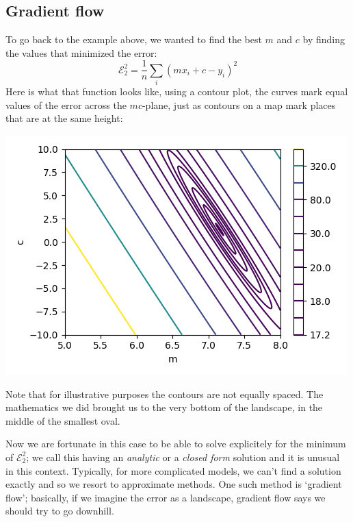 \documentclass[12pt]{article}
\begin{document}
\subsection*{Gradient flow}

To go back to the example above, we wanted to find the best $m$ and $c$ by finding the values that minimized the error:
\begin{equation}
\mathcal{E}_2^2=\frac{1}{n}\sum_i(mx_i+c-y_i)^2
\end{equation}  
Here is what that function looks like, using a contour plot, the
curves mark equal values of the error across the $mc$-plane, just as
contours on a map mark places that are at the same height:
\begin{center}
  \includegraphics[]{02.3_contour.png}
  \end{center}
Note that for illustrative purposes the contours are not equally
spaced. The mathematics we did brought us to the very bottom of the
landscape, in the middle of the smallest oval.

Now we are fortunate in this case to be able to solve explicitely for
the minimum of $\mathcal{E}_2^2$; we call this having an
\textsl{analytic} or a \textsl{closed form} solution and it is unusual
in this context. Typically, for more complicated models, we can't find
a solution exactly and so we resort to approximate methods. One such
method is `gradient flow'; basically, if we imagine the error as a
landscape, gradient flow says we should try to go downhill.
\end{document}
